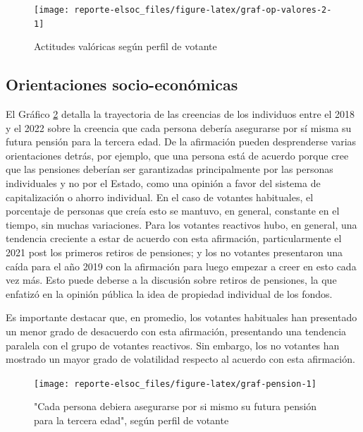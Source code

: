 \documentclass[
  12pt,
]{book}
\begin{document}
\begin{figure}

{\centering \texttt{[image: reporte-elsoc\_files/figure-latex/graf-op-valores-2-1]} 

}

\caption{Actitudes valóricas según perfil de votante}\label{fig:graf-op-valores-2}
\end{figure}

\hypertarget{orientaciones-socio-econuxf3micas}{%
\subsection{Orientaciones socio-económicas}\label{orientaciones-socio-econuxf3micas}}

El Gráfico \ref{fig:graf-pension} detalla la trayectoria de las creencias de los individuos entre el 2018 y el 2022 sobre la creencia que cada persona debería asegurarse por sí misma su futura pensión para la tercera edad. De la afirmación pueden desprenderse varias orientaciones detrás, por ejemplo, que una persona está de acuerdo porque cree que las pensiones deberían ser garantizadas principalmente por las personas individuales y no por el Estado, como una opinión a favor del sistema de capitalización o ahorro individual. En el caso de votantes habituales, el porcentaje de personas que creía esto se mantuvo, en general, constante en el tiempo, sin muchas variaciones. Para los votantes reactivos hubo, en general, una tendencia creciente a estar de acuerdo con esta afirmación, particularmente el 2021 post los primeros retiros de pensiones; y los no votantes presentaron una caída para el año 2019 con la afirmación para luego empezar a creer en esto cada vez más. Esto puede deberse a la discusión sobre retiros de pensiones, la que enfatizó en la opinión pública la idea de propiedad individual de los fondos.

Es importante destacar que, en promedio, los votantes habituales han presentado un menor grado de desacuerdo con esta afirmación, presentando una tendencia paralela con el grupo de votantes reactivos. Sin embargo, los no votantes han mostrado un mayor grado de volatilidad respecto al acuerdo con esta afirmación.

\begin{figure}

{\centering \texttt{[image: reporte-elsoc\_files/figure-latex/graf-pension-1]} 

}

\caption{"Cada persona debiera asegurarse por si mismo su futura pensión para la tercera edad", según perfil de votante}\label{fig:graf-pension}
\end{figure}
\end{document}
